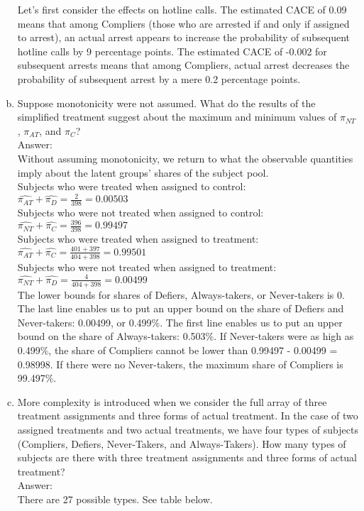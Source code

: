 \documentclass[11pt,notitlepage]{article}\usepackage[]{graphicx}\usepackage[]{color}
\begin{document}
\begin{enumerate}[a)]
Let's first consider the effects on hotline calls. The estimated CACE of 0.09 means that among Compliers (those who are arrested if and only if assigned to arrest), an actual arrest appears to increase the probability of subsequent hotline calls by 9 percentage points. The estimated CACE of -0.002 for subsequent arrests means that among Compliers, actual arrest decreases the probability of subsequent arrest by a mere 0.2 percentage points. 


\item Suppose monotonicity were not assumed. What do the results of the simplified treatment suggest about the maximum and minimum values of $\pi_{NT}$, $\pi_{AT}$, and $\pi_{C}$? \\
Answer:\\
Without assuming monotonicity, we return to what the observable quantities imply about the latent groups' shares of the subject pool.\\

Subjects who were treated when assigned to control: $\hat{\pi_{AT}} + \hat{\pi_{D}} = \frac{2}{398} = 0.00503$ \\
Subjects who were not treated when assigned to control:  $\hat{\pi_{NT}} + \hat{\pi_{C}} = \frac{396}{398} = 0.99497$\\
Subjects who were treated when assigned to treatment: $\hat{\pi_{AT}} + \hat{\pi_{C}} = \frac{401+397}{404+398} = 0.99501$\\
Subjects who were not treated when assigned to treatment: $\hat{\pi_{NT}} + \hat{\pi_{D}} = \frac{4}{404+398} = 0.00499$\\

The lower bounds for shares of Defiers, Always-takers, or Never-takers is 0. The last line enables us to put an upper bound on the share of Defiers and Never-takers: 0.00499, or 0.499\%. The first line enables us to put an upper bound on the share of Always-takers: 0.503\%. If Never-takers were as high as 0.499\%, the share of Compliers cannot be lower than 0.99497 - 0.00499 = 0.98998. If there were no Never-takers, the maximum share of Compliers is 99.497\%.

\item More complexity is introduced when we consider the full array of three treatment assignments and three forms of actual treatment. In the case of two assigned treatments and two actual treatments, we have four types of subjects (Compliers, Defiers, Never-Takers, and Always-Takers). How many types of subjects are there with three treatment assignments and three forms of actual treatment?\\
Answer:\\
There are 27 possible types. See table below.


\end{enumerate}
\end{document}
